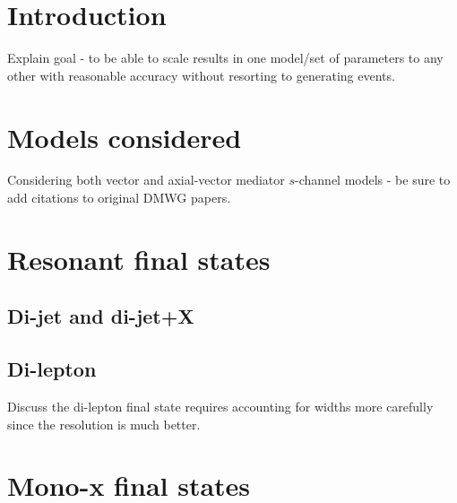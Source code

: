 \documentclass[a4paper, 11pt,notoc]{article}
\begin{document}
\maketitle

\newpage 


\section{Introduction}
\label{sec:introduction}

Explain goal - to be able to scale results in one model/set of parameters to any other with reasonable accuracy without resorting to generating events.


\section{Models considered}
\label{sec:models}

Considering both vector and axial-vector mediator $s$-channel models - be sure to add citations to original DMWG papers.


\section{Resonant final states}


\subsection{Di-jet and di-jet+X}

\subsection{Di-lepton}

Discuss the di-lepton final state requires accounting for widths more carefully since the resolution is much better.


\section{Mono-x final states}
\end{document}
